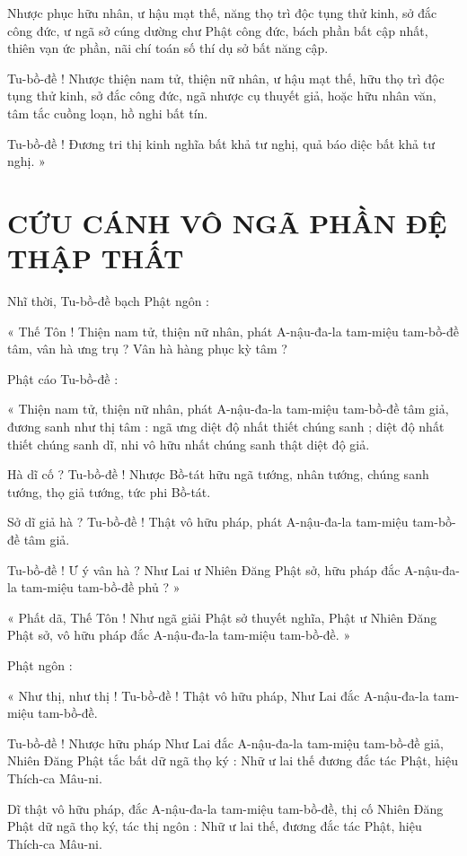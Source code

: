 	Nhược phục hữu nhân, ư hậu mạt thế, năng thọ trì độc tụng thử kinh, sở đắc công đức, ư ngã sở cúng dường chư Phật công đức, bách phần bất cập nhất, thiên vạn ức phần, nãi chí toán số thí dụ sở bất năng cập.
	
	Tu-bồ-đề ! Nhược thiện nam tử, thiện nữ nhân, ư hậu mạt thế, hữu thọ trì độc tụng thử kinh, sở đắc công đức, ngã nhược cụ thuyết giả, hoặc hữu nhân văn, tâm tắc cuồng loạn, hồ nghi bất tín. 
	
	Tu-bồ-đề ! Đương tri thị kinh nghĩa bất khả tư nghị, quả báo diệc bất khả tư nghị. »
	
	\section*{CỨU CÁNH VÔ NGÃ PHẦN ĐỆ THẬP THẤT}
	
	Nhĩ thời, Tu-bồ-đề bạch Phật ngôn :
	
	« Thế Tôn ! Thiện nam tử, thiện nữ nhân, phát A-nậu-đa-la tam-miệu tam-bồ-đề tâm, vân hà ưng trụ ? Vân hà hàng phục kỳ tâm ?
	
	Phật cáo Tu-bồ-đề :
	
	« Thiện nam tử, thiện nữ nhân, phát A-nậu-đa-la tam-miệu tam-bồ-đề tâm giả, đương sanh như thị tâm : ngã ưng diệt độ nhất thiết chúng sanh ; diệt độ nhất thiết chúng sanh dĩ, nhi vô hữu nhất chúng sanh thật diệt độ giả. 
	
	Hà dĩ cố ? Tu-bồ-đề ! Nhược Bồ-tát hữu ngã tướng, nhân tướng, chúng sanh tướng, thọ giả tướng, tức phi Bồ-tát. 
	
	Sở dĩ giả hà ? Tu-bồ-đề ! Thật vô hữu pháp, phát A-nậu-đa-la tam-miệu tam-bồ-đề tâm giả.
	
	Tu-bồ-đề ! Ư ý vân hà ? Như Lai ư Nhiên Đăng Phật sở, hữu pháp đắc A-nậu-đa-la tam-miệu tam-bồ-đề phủ ? »
	
	« Phất dã, Thế Tôn ! Như ngã giải Phật sở thuyết nghĩa, Phật ư Nhiên Đăng Phật sở, vô hữu pháp đắc A-nậu-đa-la tam-miệu tam-bồ-đề. »
	
	Phật ngôn :
	
	« Như thị, như thị ! Tu-bồ-đề ! Thật vô hữu pháp, Như Lai đắc A-nậu-đa-la tam-miệu tam-bồ-đề. 
	
	Tu-bồ-đề ! Nhược hữu pháp Như Lai đắc A-nậu-đa-la tam-miệu tam-bồ-đề giả, Nhiên Đăng Phật tắc bất dữ ngã thọ ký : Nhữ ư lai thế đương đắc tác Phật, hiệu Thích-ca Mâu-ni. 
	
	Dĩ thật vô hữu pháp, đắc A-nậu-đa-la tam-miệu tam-bồ-đề, thị cố Nhiên Đăng Phật dữ ngã thọ ký, tác thị ngôn : Nhữ ư lai thế, đương đắc tác Phật, hiệu Thích-ca Mâu-ni.  
	
